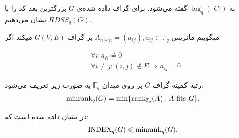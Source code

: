 به
$\log_q(|C|)$
 گفته می‌شود. برای گراف داده شده‌ی $G$ بزرگترین بعد کد را با
 $RDSS_q(G)$
 نشان می‌دهیم.
  \begin{definition}
  	میگوییم ماتریس
  	$A_{n \times n} = (a_{ij}), a_{ij} \in \mathbb{F}_q$
  	بر گراف
  	$G(V, E)$
  	میکند اگر 
  	\begin{latin}
  		\begin{align*}
  			& \forall i : a_{ii} \ne 0 \\
  			& \forall i \ne j:  (i, j) \notin E \Rightarrow a_{ij} = 0
  		\end{align*}
  	\end{latin}
  \end{definition}
 \begin{definition}
 	\label{def:minrank}
 	رتبه کمینه گراف
 	$G$
 	بر روی میدان
 	$\mathbb{F}_q$
 	به صورت زیر تعریف می‌شود:
 	\begin{equation}
 		\mathrm{minrank}_q(G) = \min\{\operatorname{rank}_{\mathbb{F}_q}(A): A \text{ fits } G\}.
 	\end{equation}
 \end{definition}
 \begin{theorem}
 	\label{thm:minranl}
 	در
 	\cite{4031356}
 	نشان داده شده است که:
 	\begin{equation}
 		\mathrm{INDEX}_q(G) \leqslant \mathrm{minrank}_q(G),
 		\label{eq:bary}
 	\end{equation} 
 \end{theorem}
